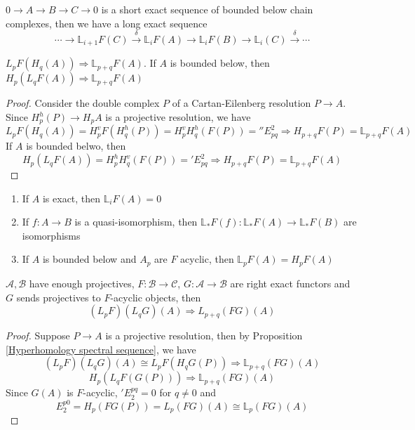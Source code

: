 \documentclass[../main.tex]{subfiles}
\begin{document}
\begin{lemma}
$0\to A\to B\to C\to0$ is a short exact sequence of bounded below chain complexes, then we have a long exact sequence
\[\cdots\to\mathbb L_{i+1}F(C)\xrightarrow{\delta}\mathbb L_iF(A)\to\mathbb L_iF(B)\to\mathbb L_i(C)\xrightarrow\delta\cdots\]
\end{lemma}

\begin{proposition}\label{Hyperhomology spectral sequence}
$L_pF(H_q(A))\Rightarrow\mathbb L_{p+q}F(A)$. If $A$ is bounded below, then $H_p(L_qF(A))\Rightarrow\mathbb L_{p+q}F(A)$
\end{proposition}

\begin{proof}
Consider the double complex $P$ of a Cartan-Eilenberg resolution $P\to A$. Since $H^h_p(P)\to H_pA$ is a projective resolution, we have
\[L_pF(H_q(A))=H^v_pF(H^h_q(P))=H^v_pH^h_q(F(P))=''E^2_{pq}\Rightarrow H_{p+q}F(P)=\mathbb L_{p+q}F(A)\]
If $A$ is bounded belwo, then
\[H_p(L_qF(A))=H^h_pH^v_q(F(P))='E^2_{pq}\Rightarrow H_{p+q}F(P)=\mathbb L_{p+q}F(A)\]
\end{proof}

\begin{corollary} \hfill
\begin{enumerate}[label=\arabic*., leftmargin=*]
\item If $A$ is exact, then $\mathbb L_iF(A)=0$
\item If $f:A\to B$ is a quasi-isomorphism, then $\mathbb L_*F(f):\mathbb L_*F(A)\to \mathbb L_*F(B)$ are isomorphisms
\item If $A$ is bounded below and $A_p$ are $F$ acyclic, then $\mathbb L_pF(A)=H_pF(A)$
\end{enumerate}
\end{corollary}

\begin{theorem}\label{Grothendieck spectral sequence}
$\mathcal A,\mathcal B$ have enough projectives, $F:\mathcal B\to\mathcal C$, $G:\mathcal{A}\to \mathcal{B}$ are right exact functors and $G$ sends projectives to $F$-acyclic objects, then
\[(L_pF)(L_qG)(A)\Rightarrow L_{p+q}(FG)(A)\]
\end{theorem}

\begin{proof}
Suppose $P\to A$ is a projective resolution, then by Proposition \ref{Hyperhomology spectral sequence}, we have
\[(L_pF)(L_qG)(A)\cong L_pF(H_qG(P))\Rightarrow \mathbb L_{p+q}(FG)(A)\]
\[H_p(L_qF(G(P)))\Rightarrow \mathbb L_{p+q}(FG)(A)\]
Since $G(A)$ is $F$-acyclic, $'E^{pq}_2=0$ for $q\neq0$ and
\[E^{p0}_2=H_p(FG(P))=L_p(FG)(A)\cong\mathbb L_p(FG)(A)\]
\end{proof}
\end{document}
